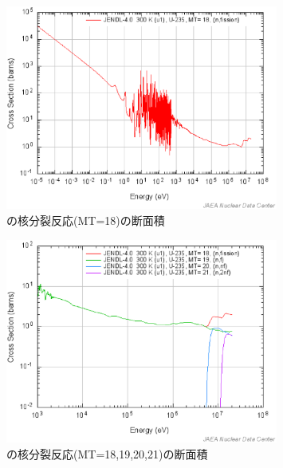 \begin{figure}[htbp]
  \centering
  \includegraphics[width=0.8\textwidth]{figure/U235Fission.eps}
  \caption{の核分裂反応(MT=18)の断面積}
  \label{fig:neutron_fission}
\end{figure}

\begin{figure}[htbp]
  \centering
  \includegraphics[width=0.8\textwidth]{figure/U235Fiss_xnf.eps}
  \caption{の核分裂反応(MT=18,19,20,21)の断面積}
  \label{fig:neutron_fission_U238}
\end{figure}
\printbibliography[segment=\therefsegment,heading=subbibliography]

\newpage
